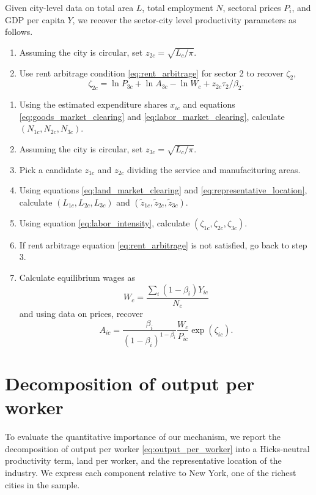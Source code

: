 \documentclass[12pt]{article}
\begin{document}
Given city-level data on total area $L$, total employment $N$, sectoral prices $P_i$, and GDP per capita $Y$, we recover the sector-city level productivity parameters as follows. 

\begin{enumerate}
	\item Assuming the city is circular, set $z_{2c}=\sqrt{L_c/\pi}$.
	\item Use rent arbitrage condition \eqref{eq:rent_arbitrage} for sector 2 to recover $\zeta_2$, 
	\[
	\zeta_{2c} = \ln P_{3c} + \ln A_{3c} - \ln W_c + z_{2c}\tau_2/\beta_2.
	\]
\end{enumerate}
\begin{enumerate}
	\item Using the estimated expenditure shares $x_{ic}$ and equations \eqref{eq:goods_market_clearing} and \eqref{eq:labor_market_clearing}, calculate $(N_{1c},N_{2c},N_{3c})$.
	\item Assuming the city is circular, set $z_{3c}=\sqrt{L_c/\pi}$.
	\item Pick a candidate $z_{1c}$ and $z_{2c}$ dividing the service and manufacituring areas.
	\item Using equations \eqref{eq:land_market_clearing} and \eqref{eq:representative_location}, calculate $(L_{1c}, L_{2c}, L_{3c})$ and $(\tilde z_{1c}, \tilde z_{2c}, \tilde z_{3c})$.
	\item Using equation \eqref{eq:labor_intensity}, calculate $(\zeta_{1c}, \zeta_{2c}, \zeta_{3c})$.
	\item If rent arbitrage equation \eqref{eq:rent_arbitrage} is not satisfied, go back to step 3.
	\item Calculate equilibrium wages as
	\[
		W_c = \frac
			{\sum_i (1-\beta_i)Y_{ic}}
			{N_c}
	\]
	and using data on prices, recover
	\[
		A_{ic} =
			 \frac {\beta_i}{(1-\beta_i)^{1-\beta_i}}
			 \frac {W_c}{P_{ic}}
			 \exp(\zeta_{ic}).
	\]
\end{enumerate}

\section{Decomposition of output per worker}
To evaluate the quantitative importance of our mechanism, we report the decomposition of output per worker \eqref{eq:output_per_worker} into a Hicks-neutral productivity term, land per worker, and the representative location of the industry. We express each component relative to New York, one of the richest cities in the sample.
\end{document}
